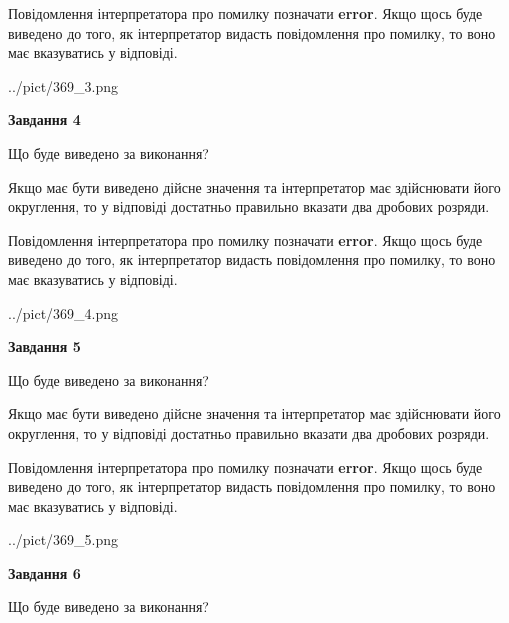 \documentclass[12pt, ukrainian]{article}
\begin{document}
{\begin {Large}
Повідомлення інтерпретатора про помилку позначати \textbf{error}.
Якщо щось буде виведено до того, як інтерпретатор видасть повідомлення про помилку, 
то воно має вказуватись у відповіді. \par

\begin{center}
	{../pict/369_3.png}
\end{center}
\newpage

{\begin {center}\textbf{Завдання 4}\end {center}}\par
Що буде виведено за виконання? \par

Якщо має бути виведено дійсне значення та інтерпретатор має здійснювати його округлення, 
то у відповіді достатньо правильно вказати два дробових розряди.

Повідомлення інтерпретатора про помилку позначати \textbf{error}.
Якщо щось буде виведено до того, як інтерпретатор видасть повідомлення про помилку, 
то воно має вказуватись у відповіді. \par

\begin{center}
	{../pict/369_4.png}
\end{center}
\newpage

{\begin {center}\textbf{Завдання 5}\end {center}}\par
Що буде виведено за виконання? \par

Якщо має бути виведено дійсне значення та інтерпретатор має здійснювати його округлення, 
то у відповіді достатньо правильно вказати два дробових розряди.

Повідомлення інтерпретатора про помилку позначати \textbf{error}.
Якщо щось буде виведено до того, як інтерпретатор видасть повідомлення про помилку, 
то воно має вказуватись у відповіді. \par

\begin{center}
	{../pict/369_5.png}
\end{center}
\newpage

{\begin {center}\textbf{Завдання 6}\end {center}}\par
Що буде виведено за виконання? \par


\end{Large}}
\end{document}
